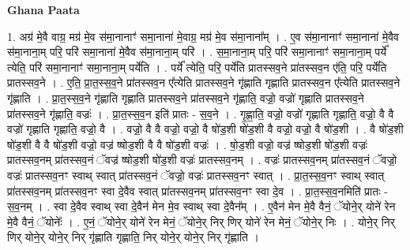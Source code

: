 \documentclass[17pt]{extarticle}
\begin{document}
\textbf{Ghana Paata } \newline

1. अग्र॑ मे॒वै वाग्र॒ मग्र॑ मे॒व स॑मा॒नानाꣳ॑ समा॒नाना॑ मे॒वाग्र॒ मग्र॑ मे॒व स॑मा॒नाना᳚म् । . ए॒व स॑मा॒नानाꣳ॑ समा॒नाना॑ मे॒वैव स॑मा॒नाना॒म् परि॒ परि॑ समा॒नाना॑ मे॒वैव स॑मा॒नाना॒म् परि॑ । . स॒मा॒नाना॒म् परि॒ परि॑ समा॒नानाꣳ॑ समा॒नाना॒म् पर्ये᳚ त्येति॒ परि॑ समा॒नानाꣳ॑ समा॒नाना॒म् पर्ये॑ति । . पर्ये᳚ त्येति॒ परि॒ पर्ये॑ति प्रातस्सव॒ने प्रा॑तस्सव॒न ए॑ति॒ परि॒ पर्ये॑ति प्रातस्सव॒ने । . ए॒ति॒ प्रा॒त॒स्स॒व॒ने प्रा॑तस्सव॒न ए᳚त्येति प्रातस्सव॒ने गृ॑ह्णाति गृह्णाति प्रातस्सव॒न ए᳚त्येति प्रातस्सव॒ने गृ॑ह्णाति । . प्रा॒त॒स्स॒व॒ने गृ॑ह्णाति गृह्णाति प्रातस्सव॒ने प्रा॑तस्सव॒ने गृ॑ह्णाति॒ वज्रो॒ वज्रो॑ गृह्णाति प्रातस्सव॒ने प्रा॑तस्सव॒ने गृ॑ह्णाति॒ वज्रः॑ । . प्रा॒त॒स्स॒व॒न इति॑ प्रातः - स॒व॒ने । . गृ॒ह्णा॒ति॒ वज्रो॒ वज्रो॑ गृह्णाति गृह्णाति॒ वज्रो॒ वै वै वज्रो॑ गृह्णाति गृह्णाति॒ वज्रो॒ वै । . वज्रो॒ वै वै वज्रो॒ वज्रो॒ वै षो॑ड॒शी षो॑ड॒शी वै वज्रो॒ वज्रो॒ वै षो॑ड॒शी । . वै षो॑ड॒शी षो॑ड॒शी वै वै षो॑ड॒शी वज्रो॒ वज्र॑ ष्षोड॒शी वै वै षो॑ड॒शी वज्रः॑ । . षो॒ड॒शी वज्रो॒ वज्र॑ ष्षोड॒शी षो॑ड॒शी वज्रः॑ प्रातस्सव॒नम् प्रा॑तस्सव॒नं ॅवज्र॑ ष्षोड॒शी षो॑ड॒शी वज्रः॑ प्रातस्सव॒नम् । . वज्रः॑ प्रातस्सव॒नम् प्रा॑तस्सव॒नं ॅवज्रो॒ वज्रः॑ प्रातस्सव॒नꣳ स्वाथ् स्वात् प्रा॑तस्सव॒नं ॅवज्रो॒ वज्रः॑ प्रातस्सव॒नꣳ स्वात् । . प्रा॒त॒स्स॒व॒नꣳ स्वाथ् स्वात् प्रा॑तस्सव॒नम् प्रा॑तस्सव॒नꣳ स्वा दे॒वैव स्वात् प्रा॑तस्सव॒नम् प्रा॑तस्सव॒नꣳ स्वा दे॒व । . प्रा॒त॒स्स॒व॒नमिति॑ प्रातः - स॒व॒नम् । . स्वा दे॒वैव स्वाथ् स्वा दे॒वैन॑ मेन मे॒व स्वाथ् स्वा दे॒वैन᳚म् । . ए॒वैन॑ मेन मे॒वै वैनं॒ ॅयोने॒र् योने॑ रेन मे॒वै वैनं॒ ॅयोनेः᳚ । . ए॒नं॒ ॅयोने॒र् योने॑ रेन मेनं॒ ॅयोने॒र् निर् णिर् योने॑ रेन मेनं॒ ॅयोने॒र् निः । . योने॒र् निर् णिर् योने॒र् योने॒र् निर् गृ॑ह्णाति गृह्णाति॒ निर् योने॒र् योने॒र् निर् गृ॑ह्णाति । \newline
\end{document}
